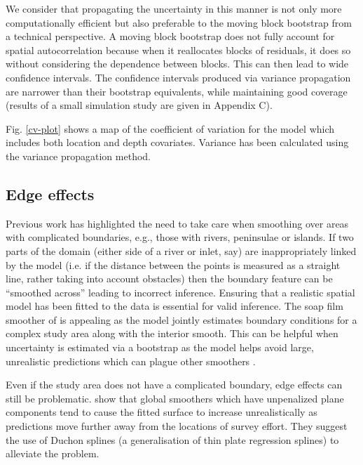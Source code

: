 \documentclass[a4paper,12pt]{article}
\begin{document}
We consider that propagating the uncertainty in this manner is not only more computationally efficient but also preferable to the moving block bootstrap from a technical perspective. A moving block bootstrap does not fully account for spatial autocorrelation because when it reallocates  blocks of residuals, it does so without considering the dependence between blocks. This can then lead to wide confidence intervals. The confidence intervals produced via variance propagation are narrower than their bootstrap equivalents, while maintaining good coverage (results of a small simulation study are given in Appendix C).

Fig. \ref{cv-plot} shows a map of the coefficient of variation for the model which includes both location and depth covariates. Variance has been calculated using the variance propagation method. 

\subsection*{Edge effects}
\label{s:leakage}

Previous work \citep{Ramsay:2002uo,Wang:2007tf,Wood:2008vo,ScottHayward:2011tc,Miller:2012tm} has highlighted the need to take care when smoothing over areas with complicated boundaries, e.g., those with rivers, peninsulae or islands. If two parts of the domain (either side of a river or inlet, say) are inappropriately linked by the model (i.e. if the distance between the points is measured as a straight line, rather taking into account obstacles) then the boundary feature can be ``smoothed across'' leading to incorrect inference. Ensuring that a realistic spatial model has been fitted to the data is essential for valid inference. The soap film smoother of \cite{Wood:2008vo} is appealing as the model jointly estimates boundary conditions for a complex study area along with the interior smooth. This can be helpful when uncertainty is estimated via a bootstrap as the model helps avoid large, unrealistic predictions which can plague other smoothers \citep{Bravington:2009vo}.

Even if the study area does not have a complicated boundary, edge effects can still be problematic. \cite{Miller:wx} show that global smoothers which have unpenalized plane components tend to cause the fitted surface to increase unrealistically as predictions move further away from the locations of survey effort. They suggest the use of Duchon splines (a generalisation of thin plate regression splines) to alleviate the problem.
\end{document}
